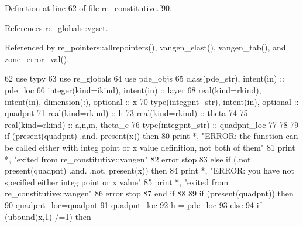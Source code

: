 Definition at line 62 of file re\+\_\+constitutive.\+f90.



References re\+\_\+globals\+::vgset.



Referenced by re\+\_\+pointers\+::allrepointers(), vangen\+\_\+elast(), vangen\+\_\+tab(), and zone\+\_\+error\+\_\+val().


\begin{DoxyCode}
62       \textcolor{keywordtype}{use }typy
63       \textcolor{keywordtype}{use }re_globals
64       \textcolor{keywordtype}{use }pde_objs
65       \textcolor{keywordtype}{class}(pde_str), \textcolor{keywordtype}{intent(in)} :: pde\_loc
66       \textcolor{keywordtype}{integer(kind=ikind)}, \textcolor{keywordtype}{intent(in)} :: layer
68       \textcolor{keywordtype}{real(kind=rkind)}, \textcolor{keywordtype}{intent(in)}, \textcolor{keywordtype}{dimension(:)}, \textcolor{keywordtype}{optional} :: x
70       \textcolor{keywordtype}{type}(integpnt_str), \textcolor{keywordtype}{intent(in)}, \textcolor{keywordtype}{optional} :: quadpnt
71       \textcolor{keywordtype}{real(kind=rkind)} :: h
73       \textcolor{keywordtype}{real(kind=rkind)} :: theta
74 
75       \textcolor{keywordtype}{real(kind=rkind)} :: a,n,m, theta\_e
76       \textcolor{keywordtype}{type}(integpnt_str) :: quadpnt\_loc
77       
78 
79       \textcolor{keywordflow}{if} (\textcolor{keyword}{present}(quadpnt) .and. \textcolor{keyword}{present}(x)) \textcolor{keywordflow}{then}
80         print *, \textcolor{stringliteral}{"ERROR: the function can be called either with integ point or x value definition, not both
       of them"}
81         print *, \textcolor{stringliteral}{"exited from re\_constitutive::vangen"}
82         error stop
83       \textcolor{keywordflow}{else} \textcolor{keywordflow}{if} (.not. \textcolor{keyword}{present}(quadpnt) .and. .not. \textcolor{keyword}{present}(x)) \textcolor{keywordflow}{then}
84         print *, \textcolor{stringliteral}{"ERROR: you have not specified either integ point or x value"}
85         print *, \textcolor{stringliteral}{"exited from re\_constitutive::vangen"}
86         error stop
87 \textcolor{keywordflow}{      end if}
88       
89       \textcolor{keywordflow}{if} (\textcolor{keyword}{present}(quadpnt)) \textcolor{keywordflow}{then}
90         quadpnt\_loc=quadpnt
91         quadpnt\_loc%
92         h = pde\_loc%
93       \textcolor{keywordflow}{else}
94         \textcolor{keywordflow}{if} (ubound(x,1) /=1) \textcolor{keywordflow}{then}

\end{DoxyCode}
